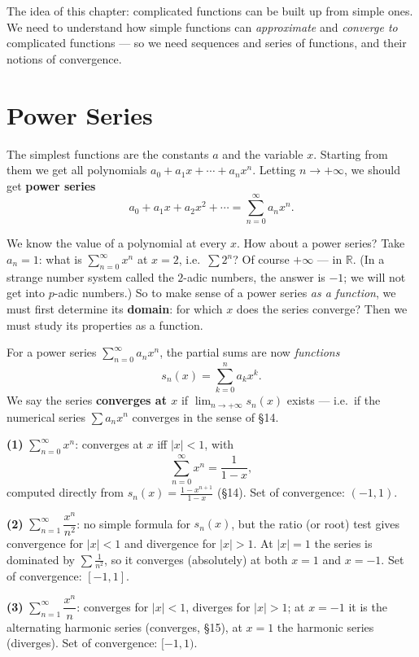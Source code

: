 \documentclass[11pt]{report}
\begin{document}
The idea of this chapter: complicated functions can be built up from simple ones. We need to understand how simple functions can \emph{approximate} and \emph{converge to} complicated functions --- so we need sequences and series of functions, and their notions of convergence.


\section{Power Series}

The simplest functions are the constants $a$ and the variable $x$. Starting from them we get all polynomials $a_0 + a_1 x + \cdots + a_n x^n$. Letting $n \to +\infty$, we should get \textbf{power series}
\[
a_0 + a_1 x + a_2 x^2 + \cdots = \sum_{n=0}^{\infty} a_n x^n.
\]

We know the value of a polynomial at every $x$. How about a power series? Take $a_n = 1$: what is $\sum_{n=0}^\infty x^n$ at $x = 2$, i.e.\ $\sum 2^n$? Of course $+\infty$ --- in $\mathbb{R}$. (In a strange number system called the $2$-adic numbers, the answer is $-1$; we will not get into $p$-adic numbers.) So to make sense of a power series \emph{as a function}, we must first determine its \textbf{domain}: for which $x$ does the series converge? Then we must study its properties as a function.

\begin{defbox}
For a power series $\sum_{n=0}^\infty a_n x^n$, the partial sums are now \emph{functions}
\[
s_n(x) = \sum_{k=0}^n a_k x^k.
\]
We say the series \textbf{converges at $x$} if $\lim_{n\to+\infty} s_n(x)$ exists --- i.e.\ if the numerical series $\sum a_n x^n$ converges in the sense of \S 14.
\end{defbox}

\begin{exbox}
\textbf{(1)} $\sum_{n=0}^\infty x^n$: converges at $x$ iff $|x| < 1$, with
\[
\sum_{n=0}^\infty x^n = \frac{1}{1-x},
\]
computed directly from $s_n(x) = \tfrac{1-x^{n+1}}{1-x}$ (\S 14). Set of convergence: $(-1,1)$.

\textbf{(2)} $\sum_{n=1}^\infty \dfrac{x^n}{n^2}$: no simple formula for $s_n(x)$, but the ratio (or root) test gives convergence for $|x| < 1$ and divergence for $|x| > 1$. At $|x| = 1$ the series is dominated by $\sum \tfrac{1}{n^2}$, so it converges (absolutely) at both $x = 1$ and $x = -1$. Set of convergence: $[-1, 1]$.

\textbf{(3)} $\sum_{n=1}^\infty \dfrac{x^n}{n}$: converges for $|x| < 1$, diverges for $|x| > 1$; at $x = -1$ it is the alternating harmonic series (converges, \S 15), at $x = 1$ the harmonic series (diverges). Set of convergence: $[-1, 1)$.
\end{exbox}
\end{document}

